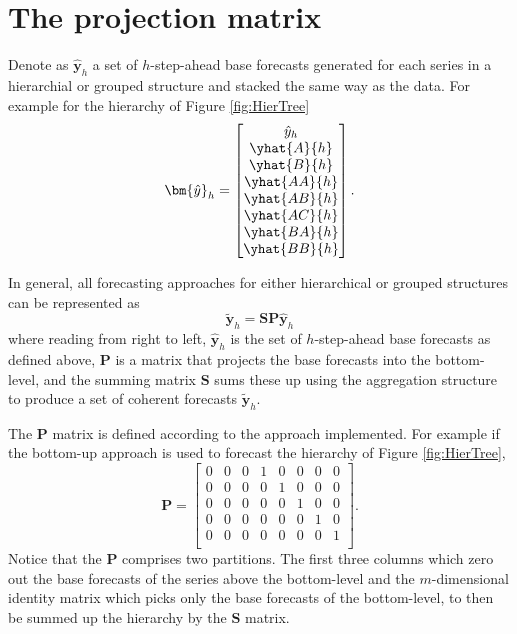 \documentclass[]{book}
\begin{document}
\hypertarget{Hier:projection}{%
\section{The projection matrix}\label{Hier:projection}}

Denote as \(\bm{\hat{y}}_h\) a set of \(h\)-step-ahead base forecasts generated for each series in a hierarchial or grouped structure and stacked the same way as the data. For example for the hierarchy of Figure \ref{fig:HierTree}
\[
\bm{\hat{y}}_h=\begin{bmatrix}
    \hat{y}_h \\
    \yhat{A}{h} \\
    \yhat{B}{h} \\
    \yhat{AA}{h} \\
    \yhat{AB}{h} \\
    \yhat{AC}{h} \\
    \yhat{BA}{h} \\
    \yhat{BB}{h} \\
  \end{bmatrix}.
\]

In general, all forecasting approaches for either hierarchical or grouped structures can be represented as
\begin{equation}
  \bm{\tilde{y}}_h=\bm{S}\bm{P}\bm{\hat{y}}_h
  \label{eq:SP}
\end{equation}
where reading from right to left, \(\bm{\hat{y}}_h\) is the set of \(h\)-step-ahead base forecasts as defined above, \(\bm{P}\) is a matrix that projects the base forecasts into the bottom-level, and the summing matrix \(\bm{S}\) sums these up using the aggregation structure to produce a set of coherent forecasts \(\bm{\tilde{y}}_h\).

The \(\bm{P}\) matrix is defined according to the approach implemented. For example if the bottom-up approach is used to forecast the hierarchy of Figure \ref{fig:HierTree},
\[\bm{P}=
  \begin{bmatrix}
    0 & 0 & 0 & 1 & 0 & 0 & 0 & 0\\
    0 & 0 & 0 & 0 & 1 & 0 & 0 & 0\\
    0 & 0 & 0 & 0 & 0 & 1 & 0 & 0\\
    0 & 0 & 0 & 0 & 0 & 0 & 1 & 0\\
    0 & 0 & 0 & 0 & 0 & 0 & 0 & 1\\
  \end{bmatrix}.
  \]
Notice that the \(\bm{P}\) comprises two partitions. The first three columns which zero out the base forecasts of the series above the bottom-level and the \(m\)-dimensional identity matrix which picks only the base forecasts of the bottom-level, to then be summed up the hierarchy by the \(\bm{S}\) matrix.
\end{document}
